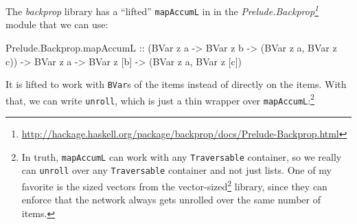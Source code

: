\documentclass[]{article}
\newenvironment{Shaded}{}{}
\newcommand{\CommentTok}[1]{\textcolor[rgb]{0.38,0.63,0.69}{\textit{#1}}}
\newcommand{\DataTypeTok}[1]{\textcolor[rgb]{0.56,0.13,0.00}{#1}}
\newcommand{\FunctionTok}[1]{\textcolor[rgb]{0.02,0.16,0.49}{#1}}
\newcommand{\KeywordTok}[1]{\textcolor[rgb]{0.00,0.44,0.13}{\textbf{#1}}}
\newcommand{\NormalTok}[1]{#1}
\newcommand{\OtherTok}[1]{\textcolor[rgb]{0.00,0.44,0.13}{#1}}
\renewcommand{\href}[2]{#2\footnote{\url{#1}}}
\begin{document}
The \emph{backprop} library has a ``lifted'' \texttt{mapAccumL} in in the
\emph{\href{http://hackage.haskell.org/package/backprop/docs/Prelude-Backprop.html}{Prelude.Backprop}}
module that we can use:

\begin{Shaded}
\begin{Highlighting}[]
\NormalTok{Prelude.Backprop.mapAccumL}
\OtherTok{    ::}\NormalTok{ (}\DataTypeTok{BVar}\NormalTok{ z a }\OtherTok{->} \DataTypeTok{BVar}\NormalTok{ z b }\OtherTok{->}\NormalTok{ (}\DataTypeTok{BVar}\NormalTok{ z a, }\DataTypeTok{BVar}\NormalTok{ z c))}
    \OtherTok{->} \DataTypeTok{BVar}\NormalTok{ z a}
    \OtherTok{->} \DataTypeTok{BVar}\NormalTok{ z [b]}
    \OtherTok{->}\NormalTok{ (}\DataTypeTok{BVar}\NormalTok{ z a, }\DataTypeTok{BVar}\NormalTok{ z [c])}
\end{Highlighting}
\end{Shaded}

It is lifted to work with \texttt{BVar}s of the items instead of directly on the
items. With that, we can write \texttt{unroll}, which is just a thin wrapper
over \texttt{mapAccumL}:\footnote{In truth, \texttt{mapAccumL} can work with any
  \texttt{Traversable} container, so we really can \texttt{unroll} over any
  \texttt{Traversable} container and not just lists. One of my favorite is the
  sized vectors from the
  \href{http://hackage.haskell.org/package/vector-sized}{vector-sized} library,
  since they can enforce that the network always gets unrolled over the same
  number of items.}

\begin{Shaded}
\end{Shaded}
\end{document}
